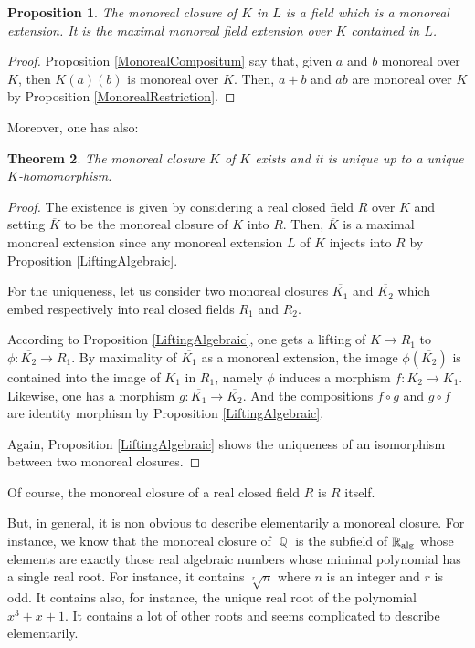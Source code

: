 \documentclass[12pt]{amsart}
\newtheorem{thm}{Theorem}[section]
\newtheorem{prop}[thm]{Proposition}
\theoremstyle{definition}
\DeclareMathOperator{\QQ}{\mathbb Q}
\def \RR {{\mathbb R}}
\begin{document}
\begin{prop} 
The monoreal closure of $K$ in $L$ is a field which is a monoreal extension. It is the maximal monoreal field extension over $K$ contained in $L$.
\end{prop} 


\begin{proof}
Proposition \ref{MonorealCompositum} say that, given $a$ and $b$ monoreal over $K$, then
$K(a)(b)$ is monoreal over $K$. Then, $a+b$ and $ab$ are monoreal over $K$ by Proposition \ref{MonorealRestriction}. 	
\end{proof}



Moreover, one has also:
\begin{thm}
The monoreal closure $\overline{K}$ of $K$ exists and it is unique up to a unique $K$-homomorphism.
\end{thm}
\begin{proof}
The existence is given by considering a real closed field $R$ over $K$ and setting $\overline{K}$ to be the %
monoreal closure of $K$ into $R$.
Then, $\overline{K}$ is a maximal monoreal extension since any monoreal extension $L$ of $K$ injects into $R$ by Proposition \ref{LiftingAlgebraic}.




For the uniqueness, let us consider two monoreal closures $\overline{K_1}$	and $\overline{K_2}$ which embed respectively into real closed fields $R_1$ and $R_2$.


According to Proposition \ref{LiftingAlgebraic},
one gets a lifting of $K\to R_1$ to $\phi:\overline{K_2}\to R_1$. By maximality of $\overline{K_1}$ as a monoreal extension, the image $\phi(\overline{K_2})$ is contained into the image of $\overline{K_1}$ in $R_1$, namely $\phi$ induces a morphism $f:\overline{K_2}\to \overline{K_1}$.
Likewise, one has a morphism $g:\overline{K_1}\to \overline{K_2}$. And the compositions $f\circ g$ and $g\circ f$ are identity morphism by Proposition \ref{LiftingAlgebraic}.

Again, Proposition \ref{LiftingAlgebraic} shows the uniqueness of an isomorphism between two monoreal closures.
\end{proof}	



	Of course, the monoreal closure of a real closed field $R$ is $R$ itself.
	
	But, in general, it is non obvious to describe elementarily a monoreal closure. For instance, we know that 
	the monoreal closure %
	of $\QQ$ is the subfield of $\RR_{\rm{alg}}$ 
	whose elements are exactly those real algebraic numbers whose minimal polynomial has a single real root. For instance, it contains $\sqrt[r]{n}$ where $n$ is an integer and $r$ is odd. It contains also, for instance, the unique real root of the polynomial $x^3+x+1$. It contains a lot of other roots and seems complicated to describe elementarily.
\end{document}
